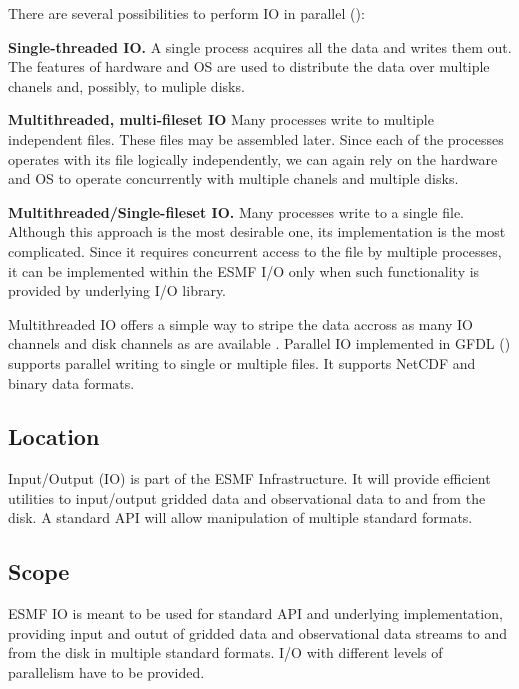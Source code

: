 There are several possibilities to perform IO in parallel (\cite{MPI-2}):
\begin{description}
\item {\bf Single-threaded IO.} A single process acquires all the data and
writes them out. The features of hardware and OS are used to distribute the 
data over multiple chanels and, possibly, to muliple disks.

\item {\bf Multithreaded, multi-fileset IO} Many processes write to
multiple independent files. These files may be assembled later. Since each of 
the processes operates with its file logically independently, we can again 
rely on the hardware and OS to operate concurrently with multiple chanels and 
multiple disks. 
 
\item {\bf Multithreaded/Single-fileset IO.} Many processes write to a
single file. Although this approach is the most desirable one, its 
implementation is the most complicated. Since it requires concurrent access 
to the file by multiple processes, it can be implemented within the ESMF I/O 
only when such functionality is provided by underlying I/O library. 
\end{description}

Multithreaded IO offers a simple way to stripe the data accross as many
IO channels and disk channels as are available \cite{MPI-2, 
Balaji_Parallel_IO_1999, Balaji_Parallel_IO_2000}. Parallel IO implemented in 
GFDL (\cite{mpp_io}) supports parallel writing to single or multiple files. 
It supports NetCDF and binary data formats.



\subsection{Location}

Input/Output (IO) is part of the ESMF Infrastructure.  It will provide
efficient utilities to input/output gridded data and observational data
to and from the disk. A standard API will allow manipulation of multiple
standard formats.


\subsection{Scope}

ESMF IO is meant to be used for standard API and underlying implementation, 
providing input and outut of gridded data and observational data streams to 
and from the disk in multiple standard formats. I/O with different levels of 
parallelism have to be provided.  


















